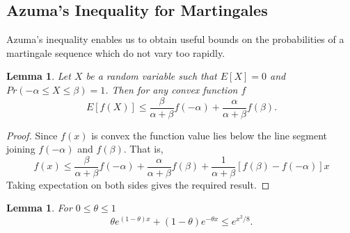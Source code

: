 \documentclass[a4paper,10pt]{article}
\theoremstyle{plain}
\newtheorem{lem}[thm]{Lemma}
\theoremstyle{definition}
\theoremstyle{remark}
\begin{document}
\subsection{Azuma's Inequality for Martingales}
Azuma's inequality enables us to obtain useful bounds on the probabilities of a martingale sequence which do not vary too rapidly. 
\begin{lem}
Let $X$ be a random variable such that $E[X]=0$ and $Pr(-\alpha \leq X \leq \beta)=1$. Then for any convex function $f$
\begin{equation*}
E[f(X)] \leq \frac{\beta}{\alpha+\beta}f(-\alpha)+\frac{\alpha}{\alpha+\beta}f(\beta).
\end{equation*}
\end{lem}
\begin{proof}
Since $f(x)$ is convex the function value lies below the line segment joining $f(-\alpha)$ and $f(\beta)$. That is,
\begin{equation*}
f(x) \leq \frac{\beta}{\alpha+\beta}f(-\alpha)+\frac{\alpha}{\alpha+\beta}f(\beta)+ \frac{1}{\alpha+\beta}[f(\beta)-f(-\alpha)]x
\end{equation*}
Taking expectation on both sides gives the required result.
\end{proof}
\begin{lem}
\label{exponential lemma}
For $0 \leq \theta \leq 1$
\begin{equation*}
\theta e^{(1-\theta)x}+(1-\theta)e^{-\theta x} \leq e^{x^2/8}.
\end{equation*}
\end{lem}
\end{document}
